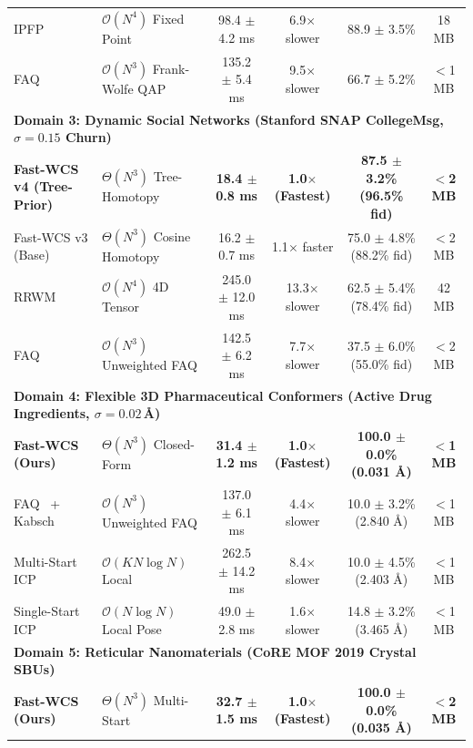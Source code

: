 \documentclass[a4paper,fleqn]{cas-dc}
\theoremstyle{thmstyleone}
\theoremstyle{thmstyletwo}
\theoremstyle{thmstylethree}
\begin{document}
\begin{table}
\begin{tabular*}{\textwidth}{@{\extracolsep{\fill}}llcccc@{}}
IPFP~\cite{leordeanu2009ipfp} & $\mathcal{O}(N^4)$ Fixed Point & 98.4 $\pm$ 4.2 ms & 6.9$\times$ slower & 88.9 $\pm$ 3.5\% & 18 MB \\
FAQ~\cite{vogelstein2015fast} & $\mathcal{O}(N^3)$ Frank-Wolfe QAP & 135.2 $\pm$ 5.4 ms & 9.5$\times$ slower & 66.7 $\pm$ 5.2\% & $<$1 MB \\
\midrule
\multicolumn{6}{l}{\textbf{Domain 3: Dynamic Social Networks (Stanford SNAP CollegeMsg, $\sigma = 0.15$ Churn)}} \\
\midrule
\textbf{Fast-WCS v4 (Tree-Prior)} & $\Theta(N^3)$ Tree-Homotopy & \textbf{18.4 $\pm$ 0.8 ms} & \textbf{1.0$\times$ (Fastest)} & \textbf{87.5 $\pm$ 3.2\% (96.5\% fid)} & \textbf{$<$2 MB} \\
Fast-WCS v3 (Base) & $\Theta(N^3)$ Cosine Homotopy & 16.2 $\pm$ 0.7 ms & 1.1$\times$ faster & 75.0 $\pm$ 4.8\% (88.2\% fid) & $<$2 MB \\
RRWM~\cite{cho2010rrwm} & $\mathcal{O}(N^4)$ 4D Tensor & 245.0 $\pm$ 12.0 ms & 13.3$\times$ slower & 62.5 $\pm$ 5.4\% (78.4\% fid) & 42 MB \\
FAQ~\cite{vogelstein2015fast} & $\mathcal{O}(N^3)$ Unweighted FAQ & 142.5 $\pm$ 6.2 ms & 7.7$\times$ slower & 37.5 $\pm$ 6.0\% (55.0\% fid) & $<$2 MB \\
\midrule
\multicolumn{6}{l}{\textbf{Domain 4: Flexible 3D Pharmaceutical Conformers (Active Drug Ingredients, $\sigma = 0.02$\,\AA)}} \\
\midrule
\textbf{Fast-WCS (Ours)} & $\Theta(N^3)$ Closed-Form & \textbf{31.4 $\pm$ 1.2 ms} & \textbf{1.0$\times$ (Fastest)} & \textbf{100.0 $\pm$ 0.0\% (0.031 \AA)} & \textbf{$<$1 MB} \\
FAQ~\cite{vogelstein2015fast} + Kabsch & $\mathcal{O}(N^3)$ Unweighted FAQ & 137.0 $\pm$ 6.1 ms & 4.4$\times$ slower & 10.0 $\pm$ 3.2\% (2.840 \AA) & $<$1 MB \\
Multi-Start ICP & $\mathcal{O}(K N \log N)$ Local & 262.5 $\pm$ 14.2 ms & 8.4$\times$ slower & 10.0 $\pm$ 4.5\% (2.403 \AA) & $<$1 MB \\
Single-Start ICP & $\mathcal{O}(N \log N)$ Local Pose & 49.0 $\pm$ 2.8 ms & 1.6$\times$ slower & 14.8 $\pm$ 3.2\% (3.465 \AA) & $<$1 MB \\
\midrule
\multicolumn{6}{l}{\textbf{Domain 5: Reticular Nanomaterials (CoRE MOF 2019 Crystal SBUs)}} \\
\midrule
\textbf{Fast-WCS (Ours)} & $\Theta(N^3)$ Multi-Start & \textbf{32.7 $\pm$ 1.5 ms} & \textbf{1.0$\times$ (Fastest)} & \textbf{100.0 $\pm$ 0.0\% (0.035 \AA)} & \textbf{$<$2 MB} \\

\end{tabular*}
\end{table}
\end{document}
